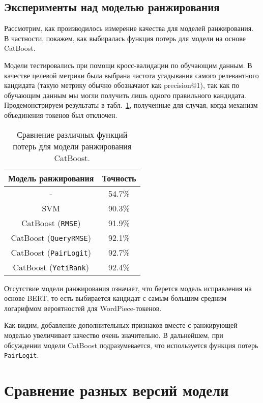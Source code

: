 \subsection{Эксперименты над моделью ранжирования}

Рассмотрим, как производилось измерение качества для моделей ранжирования. В частности, покажем, как выбиралась функция потерь для модели на основе CatBoost. 

Модели тестировались при помощи кросс-валидации по обучающим данным. В качестве целевой метрики была выбрана частота угадывания самого релевантного кандидата (такую метрику обычно обозначают как precision@1), так как по обучающим данным мы могли получить лишь одного правильного кандидата. Продемонстрируем результаты в табл.~\ref{table:catboost_losses_results}, полученные для случая, когда механизм объединения токенов был отключен.

\begin{table}[h]
	\begin{center}
		\caption{Сравнение различных функций потерь для модели ранжирования CatBoost.}
		\label{table:catboost_losses_results}
		\begin{tabular}{|c|c|}
			\hline
			\textbf{Модель ранжирования} & \textbf{Точность}  \\
			\hline
			- & 54.7\% \\
			SVM & 90.3\% \\
			CatBoost (\verb|RMSE|) & 91.9\% \\
			CatBoost (\verb|QueryRMSE|) & 92.1\% \\
			CatBoost (\verb|PairLogit|) & 92.7\% \\
			CatBoost (\verb|YetiRank|) & 92.4\% \\
			\hline
		\end{tabular}
	\end{center}
\end{table}

Отсутствие модели ранжирования означает, что берется модель исправления на основе BERT, то есть выбирается кандидат с самым большим средним логарифмом вероятностей для WordPiece-токенов.

Как видим, добавление дополнительных признаков вместе с ранжирующей моделью увеличивает качество очень значительно. В дальнейшем, при обсуждении модели CatBoost подразумевается, что используется функция потерь \verb|PairLogit|.

\section{Сравнение разных версий модели}

